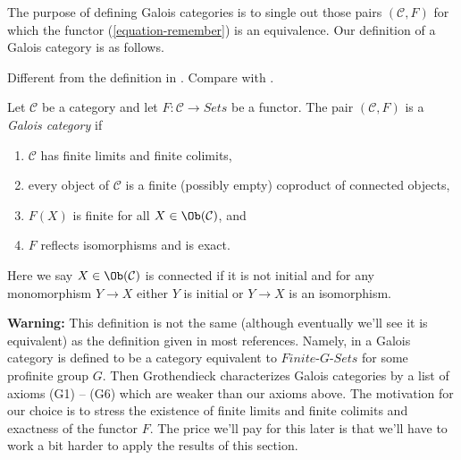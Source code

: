 \noindent
The purpose of defining Galois categories is to single out those
pairs $(\mathcal{C}, F)$ for which the functor (\ref{equation-remember})
is an equivalence. Our definition of a Galois category is as follows.

\begin{definition}
\label{definition-galois-category}
\begin{reference}
Different from the definition in \cite[Expos\'e V, Definition 5.1]{SGA1}.
Compare with \cite[Definition 7.2.1]{BS}.
\end{reference}
Let $\mathcal{C}$ be a category and let $F : \mathcal{C} \to \textit{Sets}$
be a functor. The pair $(\mathcal{C}, F)$ is a {\it Galois category} if
\begin{enumerate}
\item $\mathcal{C}$ has finite limits and finite colimits,
\item
\label{item-connected-components}
every object of $\mathcal{C}$ is a finite (possibly empty)
coproduct of connected objects,
\item $F(X)$ is finite for all $X \in \Ob(\mathcal{C})$, and
\item $F$ reflects isomorphisms and is exact.
\end{enumerate}
Here we say $X \in \Ob(\mathcal{C})$ is connected if
it is not initial and for any monomorphism $Y \to X$
either $Y$ is initial or $Y \to X$ is an isomorphism.
\end{definition}

\noindent
{\bf Warning:} This definition is not the same (although eventually we'll
see it is equivalent) as the definition given in most references.
Namely, in \cite[Expos\'e V, Definition 5.1]{SGA1} a Galois category is
defined to be a category equivalent to $\textit{Finite-}G\textit{-Sets}$
for some profinite group $G$. Then Grothendieck characterizes
Galois categories by a list of axioms (G1) -- (G6) which are weaker
than our axioms above. The motivation for our choice is to stress the
existence of finite limits and finite colimits and exactness of the
functor $F$. The price we'll pay for this later is that we'll have
to work a bit harder to apply the results of this section.

